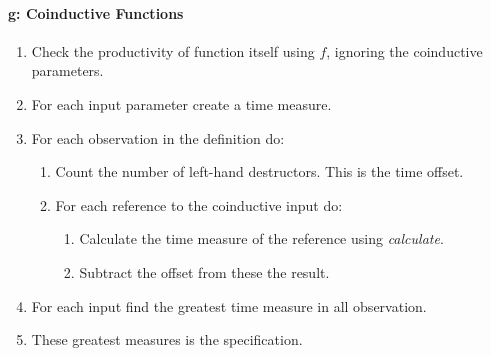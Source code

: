 \paragraph{g: Coinductive Functions}
\begin{enumerate}
\item Check the productivity of function itself using $f$, ignoring the coinductive parameters.
\item For each input parameter create a time measure.
\item For each observation in the definition do:
\begin{enumerate}
\item Count the number of left-hand destructors. This is the time offset.
\item For each reference to the coinductive input do:
\begin{enumerate}
\item Calculate the time measure of the reference using \textit{calculate}.
\item Subtract the offset from these the result.
\end{enumerate}
\end{enumerate}
\item For each input find the greatest time measure in all observation.
\item These greatest measures is the specification.
\end{enumerate}
